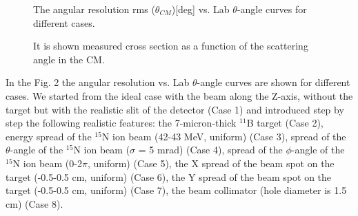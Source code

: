 \documentclass[%
 aip,
cp,  %
 amsmath,amssymb,%
 reprint,%
]{revtex4-2}
\begin{document}
\begin{figure}[h]
\caption{The angular resolution rms ($\theta_{CM}$)[deg] vs. Lab $\theta$-angle curves for different cases.}
\label{ris:fig3}
\end{figure}

\begin{figure}[h]
\caption{It is shown measured cross section as a function of the scattering angle in the CM.}
\label{ris:fig4}
\end{figure}


In the Fig. 2 the angular resolution vs. Lab $\theta$-angle curves are shown for different cases. We started from the ideal case with the beam along the Z-axis, without the target but with the realistic slit of the detector (Case 1) and introduced step by step the following realistic features: the 7-micron-thick ${}^{11}$B target (Case 2), energy spread of the ${}^{15}$N ion beam (42-43 MeV, uniform) (Case 3), spread of the $\theta$-angle of the ${}^{15}$N ion beam ($\sigma$ = 5 mrad) (Case 4),  spread of the $\phi$-angle of the ${}^{15}$N ion beam (0-2$\pi$, uniform) (Case 5), the X spread of the beam spot on the target (-0.5-0.5 cm, uniform) (Case 6), the Y spread of the beam spot on the target (-0.5-0.5 cm, uniform) (Case 7), the beam collimator (hole diameter is 1.5 cm)  (Case 8).
\end{document}
